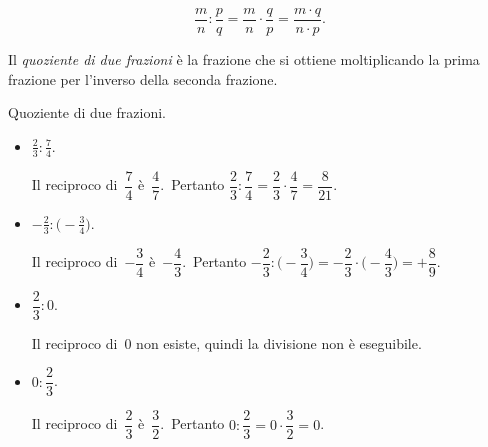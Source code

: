 \[\frac{m}{n}:\frac{p}{q}=\frac{m}{n}\cdot\frac{q}{p}=\frac{m\cdot q}{n\cdot p}.\]

\begin{definizione}
Il \emph{quoziente di due frazioni} è la frazione che si ottiene moltiplicando la prima frazione per l'inverso
della seconda frazione.
\end{definizione}

\begin{exrig}
 \begin{esempio}
Quoziente di due frazioni.
\begin{itemize}
\item $\displaystyle{\frac{2}{3}:\frac{7}{4}}$.

Il reciproco di~$\dfrac{7}{4}$ è~$\dfrac{4}{7}$.\, Pertanto\quad
$\dfrac{2}{3}:\dfrac{7}{4}=\dfrac{2}{3}\cdot\dfrac{4}{7}=\dfrac{8}{21}$.
\item $\displaystyle{-\frac{2}{3}:\bigg(-\frac{3}{4}\bigg)}$.

Il reciproco di~$-\dfrac{3}{4}$ è~$-\dfrac{4}{3}$.\, Pertanto\quad
$-\dfrac{2}{3}:\bigg(-\dfrac{3}{4}\bigg)=-\dfrac{2}{3}\cdot\bigg(-\dfrac{4}{3}\bigg)=+\dfrac{8}{9}$.

\item ${\dfrac{2}{3}:0}$.

Il reciproco di~0 non esiste, quindi la divisione non è eseguibile.

\item $0:\dfrac{2}{3}$.

Il reciproco di~$\dfrac{2}{3}$ è~$\dfrac{3}{2}$.\, Pertanto\quad
$0:\dfrac{2}{3}=0\cdot \dfrac{3}{2}=0$.
\end{itemize}
\end{esempio}
\end{exrig}

\ovalbox{\risolvii \ref{ese:3.56}, \ref{ese:3.57}, \ref{ese:3.58}, \ref{ese:3.59}}

